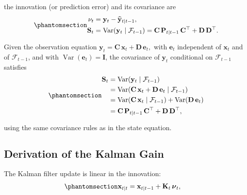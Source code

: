 \documentclass[
  letterpaper,
  DIV=11,
  numbers=noendperiod]{scrreprt}
\begin{document}
the innovation (or prediction error) and its covariance are
\begin{equation}\protect\phantomsection\label{eq-gen-0115}{
\begin{align}
  \mathbf{\nu}_t &= \mathbf{y}_t - \widehat{\mathbf{y}}_{t\mid t-1}, \\
  \mathbf{S}_t &= \operatorname{Var}(\mathbf{y}_t \mid \mathcal{F}_{t-1})
               = \mathbf{C}\,\mathbf{P}_{t\mid t-1}\,\mathbf{C}^\top
                 + \mathbf{D}\,\mathbf{D}^\top.
\end{align}
}\end{equation}

Given the observation equation
\(\mathbf{y}_t = \mathbf{C}\,\mathbf{x}_t + \mathbf{D}\,\mathbf{e}_t,\)
with \(\mathbf{e}_t\) independent of \(\mathbf{x}_t\) and of
\(\mathcal{F}_{t-1}\), and with
\(\operatorname{Var}(\mathbf{e}_t) = \mathbf{I}\), the covariance of
\(\mathbf{y}_t\) conditional on \(\mathcal{F}_{t-1}\) satisfies
\begin{equation}\protect\phantomsection\label{eq-gen-0116}{
\begin{align}
  \mathbf{S}_t
  &= \operatorname{Var}(\mathbf{y}_t \mid \mathcal{F}_{t-1}) \\
  &= \operatorname{Var}(\mathbf{C}\,\mathbf{x}_t + \mathbf{D}\,\mathbf{e}_t \mid \mathcal{F}_{t-1}) \\
  &= \operatorname{Var}(\mathbf{C}\,\mathbf{x}_t \mid \mathcal{F}_{t-1})
     + \operatorname{Var}(\mathbf{D}\,\mathbf{e}_t) \\
  &= \mathbf{C}\,\mathbf{P}_{t\mid t-1}\,\mathbf{C}^\top
     + \mathbf{D}\,\mathbf{D}^\top,
\end{align}
}\end{equation}

using the same covariance rules as in the state equation.

\subsection*{Derivation of the Kalman
Gain}\label{derivation-of-the-kalman-gain}

The Kalman filter update is linear in the innovation:
\begin{equation}\protect\phantomsection\label{eq-gen-0117}{
\begin{align}
  \mathbf{x}_{t\mid t}
    &= \mathbf{x}_{t\mid t-1} + \mathbf{K}_t\,\boldsymbol{\nu}_t,
\end{align}
}\end{equation}
\end{document}
